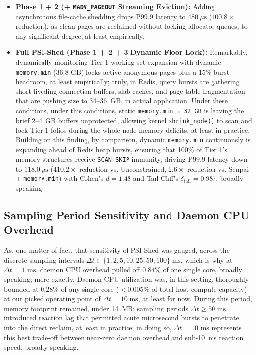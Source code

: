 \documentclass[pdflatex,sn-mathphys,Numbered]{sn-jnl}
\begin{document}
\begin{itemize}
    \item \textbf{Phase 1 + 2 (+ \texttt{MADV\_PAGEOUT} Streaming Eviction):} Adding asynchronous file-cache shedding drops P99.9 latency to $480\ \mu\text{s}$ ($100.8\times$ reduction), as clean pages are reclaimed without locking allocator queues, to any significant degree, at least empirically.
    \item \textbf{Full PSI-Shed (Phase 1 + 2 + 3 Dynamic Floor Lock):} Remarkably, dynamically monitoring Tier 1 working-set expansion with dynamic \texttt{memory.min} ($36.8\text{ GB}$) locks active anonymous pages plus a 15\% burst headroom, at least empirically; truly, in Redis, query bursts are gathering short-liveding connection buffers, slab caches, and page-table fragmentation that are pushing size to 34--36~GB, in actual application. Under these conditions, under this conditions, static \texttt{memory.min = 32 GB} is leaving the brief 2--4~GB buffers unprotected, allowing kernel \texttt{shrink\_node()} to scan and lock Tier 1 folios during the whole-node memory deficits, at least in practice. Building on this finding, by comparison, dynamic \texttt{memory.min} continuously is expanding ahead of Redis heap bursts, ensuring that 100\% of Tier 1's memory structures receive \texttt{SCAN\_SKIP} immunity, driving P99.9 latency down to $118.0\ \mu\text{s}$ ($410.2\times$ reduction vs. Unconstrained, $2.6\times$ reduction vs. Senpai + \texttt{memory.min}) with Cohen's $d = 1.48$ and Tail Cliff's $\delta_{\text{tail}} = 0.987$, broadly speaking.
\end{itemize}

\subsection{Sampling Period Sensitivity and Daemon CPU Overhead}
As, one matter of fact, that sensitivity of PSI-Shed was gauged, across the discrete sampling intervals $\Delta t \in \{1, 2, 5, 10, 25, 50, 100\}\text{ ms}$, which is why at $\Delta t = 1\text{ ms}$, daemon CPU overhead pulled off $0.84\%$ of one single core, broadly speaking; more exactly, Daemon CPU utilization was, in this setting, thoroughly bounded at $0.28\%$ of any single core ($< 0.005\%$ of total host compute capacity) at our picked operating point of $\Delta t = 10\text{ ms}$, at least for now. During this period, memory footprint remained, under 14~MB; sampling periods $\Delta t \ge 50\text{ ms}$ introduced reaction lag that permitted acute microsecond bursts to penetrate into the direct reclaim, at least in practice; in doing so, $\Delta t = 10\text{ ms}$ represents this best trade-off between near-zero daemon overhead and sub-10~ms reaction speed, broadly speaking.
\end{document}
